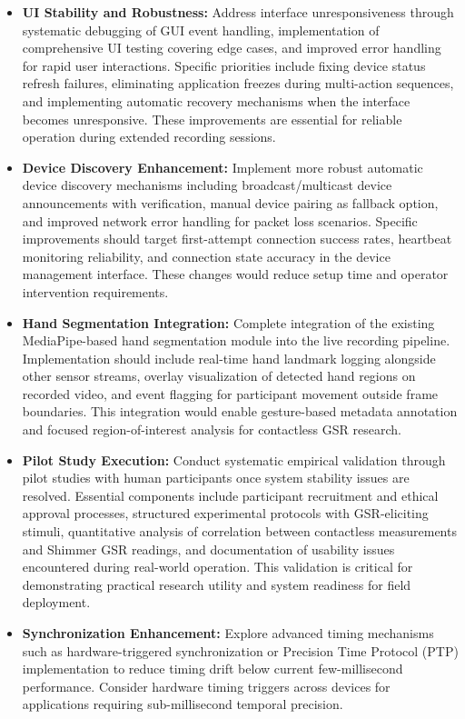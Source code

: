 \documentclass[12pt,a4paper]{article}
\begin{document}
\begin{itemize}
\item
  \textbf{UI Stability and Robustness:} Address interface unresponsiveness through systematic debugging of GUI event handling, implementation of comprehensive UI testing covering edge cases, and improved error handling for rapid user interactions. Specific priorities include fixing device status refresh failures, eliminating application freezes during multi-action sequences, and implementing automatic recovery mechanisms when the interface becomes unresponsive. These improvements are essential for reliable operation during extended recording sessions.
\item
  \textbf{Device Discovery Enhancement:} Implement more robust automatic device discovery mechanisms including broadcast/multicast device announcements with verification, manual device pairing as fallback option, and improved network error handling for packet loss scenarios. Specific improvements should target first-attempt connection success rates, heartbeat monitoring reliability, and connection state accuracy in the device management interface. These changes would reduce setup time and operator intervention requirements.
\item
  \textbf{Hand Segmentation Integration:} Complete integration of the existing MediaPipe-based hand segmentation module into the live recording pipeline. Implementation should include real-time hand landmark logging alongside other sensor streams, overlay visualization of detected hand regions on recorded video, and event flagging for participant movement outside frame boundaries. This integration would enable gesture-based metadata annotation and focused region-of-interest analysis for contactless GSR research.
\item
  \textbf{Pilot Study Execution:} Conduct systematic empirical validation through pilot studies with human participants once system stability issues are resolved. Essential components include participant recruitment and ethical approval processes, structured experimental protocols with GSR-eliciting stimuli, quantitative analysis of correlation between contactless measurements and Shimmer GSR readings, and documentation of usability issues encountered during real-world operation. This validation is critical for demonstrating practical research utility and system readiness for field deployment.
\item
  \textbf{Synchronization Enhancement:} Explore advanced timing mechanisms such as hardware-triggered synchronization or Precision Time Protocol (PTP) implementation to reduce timing drift below current few-millisecond performance. Consider hardware timing triggers across devices for applications requiring sub-millisecond temporal precision.

\end{itemize}
\end{document}
